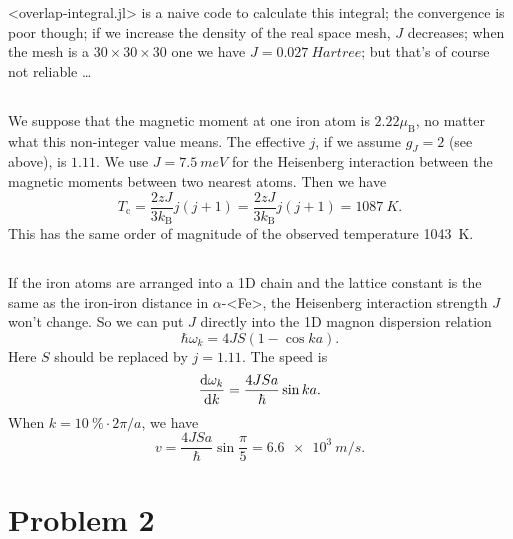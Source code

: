 \documentclass[hyperref, a4paper]{article}
\def\ce#1{<#1>}%
\def\texttt#1{<#1>}%
\newcommand*{\muB}{\mu_{\text{B}}}
\newcommand*{\kB}{k_{\text{B}}}
\begin{document}
\texttt{overlap-integral.jl} is a naive code 
to calculate this integral;
the convergence is poor though;
if we increase the density of the real space mesh, 
$J$ decreases;
when the mesh is a $30 \times 30 \times 30$ one 
we have $J = \SI{0.027}{Hartree}$;
but that's of course not reliable \dots

\subsection{}

We suppose that the magnetic moment at one iron atom is $2.22 \muB$, 
no matter what this non-integer value means.
The effective $j$, if we assume $g_J = 2$ (see above), is $1.11$.
We use $J = \SI{7.5}{meV}$ for the Heisenberg interaction 
between the magnetic moments between two nearest atoms.
Then we have 
\begin{equation}
    T_{\text{c}} = \frac{2 z J}{3 \kB} j(j+1)
    = \frac{2 z J}{3 \kB} j(j+1) = \SI{1087}{K}.
\end{equation}
This has the same order of magnitude 
of the observed temperature \SI{1043}{K}.

\subsection{}

If the iron atoms are arranged into a 1D chain 
and the lattice constant is the same as the iron-iron distance 
in $\alpha$-\ce{Fe},
the Heisenberg interaction strength $J$ won't change.
So we can put $J$ directly into the 1D magnon dispersion relation 
\begin{equation}
    \hbar \omega_k = 4 J S (1 - \cos ka) .
\end{equation}
Here $S$ should be replaced by $j = 1.11$.
The speed is 
\begin{equation}
    \dv{\omega_k}{k} = \frac{4 J S a}{\hbar} \sin ka.
\end{equation}
When $k = \SI{10}{\percent} \cdot 2 \pi / a$, we have 
\begin{equation}
    v = \frac{4 J S a}{\hbar} \sin \frac{\pi}{5} = \SI{6.6e3}{m/s}.
\end{equation}

\section{Problem 2}

\subsection{}
\end{document}
